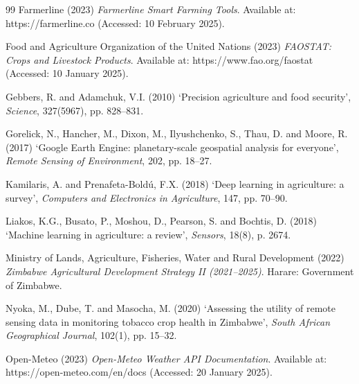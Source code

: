 \documentclass[12pt,a4paper]{report}
\begin{document}
\begin{thebibliography}{99}
Farmerline (2023) \textit{Farmerline Smart Farming Tools}. Available at: https://farmerline.co (Accessed: 10 February 2025).

Food and Agriculture Organization of the United Nations (2023) \textit{FAOSTAT: Crops and Livestock Products}. Available at: https://www.fao.org/faostat (Accessed: 10 January 2025).

Gebbers, R. and Adamchuk, V.I. (2010) `Precision agriculture and food security', \textit{Science}, 327(5967), pp. 828--831.

Gorelick, N., Hancher, M., Dixon, M., Ilyushchenko, S., Thau, D. and Moore, R. (2017) `Google Earth Engine: planetary-scale geospatial analysis for everyone', \textit{Remote Sensing of Environment}, 202, pp. 18--27.

Kamilaris, A. and Prenafeta-Boldú, F.X. (2018) `Deep learning in agriculture: a survey', \textit{Computers and Electronics in Agriculture}, 147, pp. 70--90.

Liakos, K.G., Busato, P., Moshou, D., Pearson, S. and Bochtis, D. (2018) `Machine learning in agriculture: a review', \textit{Sensors}, 18(8), p. 2674.

Ministry of Lands, Agriculture, Fisheries, Water and Rural Development (2022) \textit{Zimbabwe Agricultural Development Strategy II (2021--2025)}. Harare: Government of Zimbabwe.

Nyoka, M., Dube, T. and Masocha, M. (2020) `Assessing the utility of remote sensing data in monitoring tobacco crop health in Zimbabwe', \textit{South African Geographical Journal}, 102(1), pp. 15--32.

Open-Meteo (2023) \textit{Open-Meteo Weather API Documentation}. Available at: https://open-meteo.com/en/docs (Accessed: 20 January 2025).


\end{thebibliography}
\end{document}

